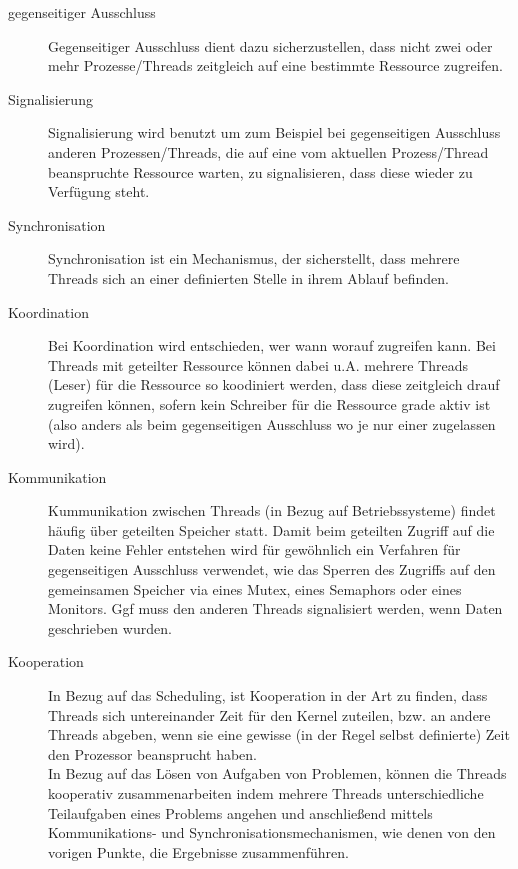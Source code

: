 \begin{description}
    \begin{description}
      \item[gegenseitiger Ausschluss]
        Gegenseitiger Ausschluss dient dazu sicherzustellen, dass nicht zwei oder mehr Prozesse/Threads zeitgleich auf eine bestimmte Ressource zugreifen.
      \item[Signalisierung ]
        Signalisierung wird benutzt um zum Beispiel bei gegenseitigen Ausschluss anderen Prozessen/Threads, die auf eine vom aktuellen Prozess/Thread beanspruchte Ressource warten, zu signalisieren, dass diese wieder zu Verfügung steht.
      \item[Synchronisation ]
        Synchronisation ist ein Mechanismus, der sicherstellt, dass mehrere Threads sich an einer definierten Stelle in ihrem Ablauf befinden.
      \item[Koordination ]
        Bei Koordination wird entschieden, wer wann worauf zugreifen kann. Bei Threads mit geteilter Ressource können dabei u.A. mehrere Threads (Leser) für die Ressource so koodiniert werden, dass diese zeitgleich drauf zugreifen können, sofern kein Schreiber für die Ressource grade aktiv ist (also anders als beim gegenseitigen Ausschluss wo je nur einer zugelassen wird).
      \item[Kommunikation ] Kummunikation zwischen Threads (in Bezug auf Betriebssysteme) findet häufig über geteilten Speicher statt. Damit beim geteilten Zugriff auf die Daten keine Fehler entstehen wird für gewöhnlich ein Verfahren für gegenseitigen Ausschluss verwendet, wie das Sperren des Zugriffs auf den gemeinsamen Speicher via eines Mutex, eines Semaphors oder eines Monitors. Ggf muss den anderen Threads signalisiert werden, wenn Daten geschrieben wurden.
      \item[Kooperation ]
        In Bezug auf das Scheduling, ist Kooperation in der Art zu finden, dass Threads sich untereinander Zeit für den Kernel zuteilen, bzw. an andere Threads abgeben, wenn sie eine gewisse (in der Regel selbst definierte) Zeit den Prozessor beansprucht haben.\\
        In Bezug auf das Lösen von Aufgaben von Problemen, können die Threads kooperativ zusammenarbeiten indem mehrere Threads unterschiedliche Teilaufgaben eines Problems angehen und anschließend mittels Kommunikations- und Synchronisationsmechanismen, wie denen von den vorigen Punkte, die Ergebnisse zusammenführen.
        
    \end{description}


\end{description}
